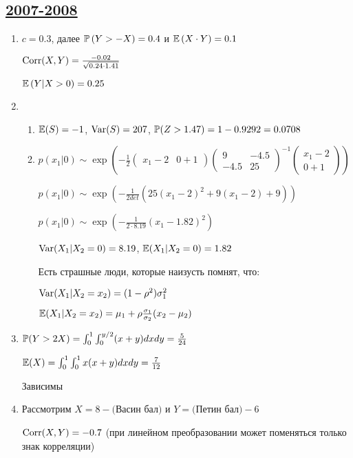 \subsection[2007-2008]{\hyperref[sec:kr_02_2007_2008]{2007-2008}}
\label{sec:sol_kr_02_2007_2008}

\begin{enumerate}
\item $c = 0.3$, далее $\P\left(Y>-X\right)=0.4$  и $\E\left(X\cdot Y\right)=0.1$

$\Corr(X,Y)=\frac{-0.02}{\sqrt{0.24\cdot 1.41}}$

$\E\left(Y|X>0\right)=0.25$
\item
\begin{enumerate}
\item $\E(S)=-1$, $\Var(S)=207$, $\P(Z>1.47)=1-0.9292=0.0708$
\item $p(x_{1}|0)\sim \exp\left(-\frac{1}{2}\left(\begin{array}{cc} {x_{1}-2} & {0+1} \end{array}\right) \left(\begin{array}{cc} {9} & {-4.5} \\ {-4.5} & {25}
\end{array}\right)^{-1}\left(\begin{array}{c} {x_{1}-2} \\ {0+1}
\end{array}\right)\right)$

$p(x_{1}|0)\sim \exp\left(-\frac{1}{2det}(25(x_{1}-2)^{2}+9(x_{1}-2)+9)\right)$

$p(x_{1}|0)\sim \exp\left(-\frac{1}{2\cdot 8.19}(x_{1}-1.82)^{2}\right)$

$\Var(X_{1}|X_{2}=0)=8.19$, $\E(X_{1}|X_{2}=0)=1.82$

Есть страшные люди, которые наизусть помнят, что:

$\Var(X_{1}|X_{2}=x_{2})=(1-\rho^{2})\sigma_{1}^{2}$

$\E(X_{1}|X_{2}=x_{2})=\mu_{1} + \rho\frac{\sigma_{1}}{\sigma_{2}}(x_{2}-\mu_{2})$
\end{enumerate}
\item $\P(Y>2X)=\int_{0}^{1}\int_{0}^{y/2}(x+y)dxdy=\frac{5}{24}$

$\E(X)=\int_{0}^{1}\int_{0}^{1}x(x+y)dxdy=\frac{7}{12}$

Зависимы
\item Рассмотрим $X=8-($Васин бал$)$ и $Y=($Петин бал$)-6$

$\Corr(X,Y)=-0.7$ (при линейном преобразовании может поменяться только знак корреляции)


\end{enumerate}
